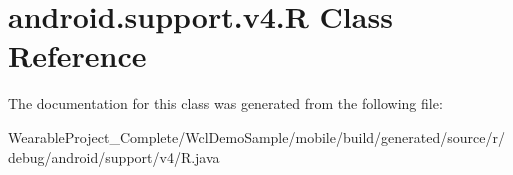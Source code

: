 \hypertarget{classandroid_1_1support_1_1v4_1_1R}{}\section{android.\+support.\+v4.\+R Class Reference}
\label{classandroid_1_1support_1_1v4_1_1R}


The documentation for this class was generated from the following file\+:\begin{DoxyCompactItemize}
\item 
Wearable\+Project\+\_\+\+Complete/\+Wcl\+Demo\+Sample/mobile/build/generated/source/r/debug/android/support/v4/R.\+java\end{DoxyCompactItemize}
